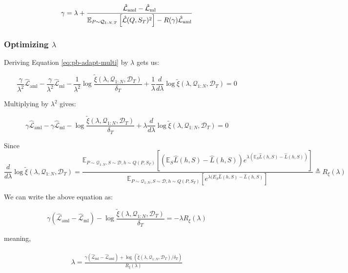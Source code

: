 \documentclass{article}
\theoremstyle{definition}
\newcommand{\Expect}[2]{\mathbb{E}_{#1}\left [#2 \right ]}
\begin{document}
\begin{align} \label{eq:meta-pb-gamma}
\begin{split}
\gamma = \lambda+\frac{\hat{\mathcal{L}}_{\mathrm{aml}}-\hat{\mathcal{L}}_{\mathrm{ml}}}{\Expect{P\sim \mathcal{Q}_{1:N,T}}{\hat{\mathcal{L}}(Q,S_T)^2}-R(\gamma)\hat{\mathcal{L}}_{\mathrm{aml}}}
\end{split}\hfill
\end{align}

\subsubsection{Optimizing $\lambda$}

Deriving Equation \ref{eq:pb-adapt-multi} by $\lambda$ gets us:

$$\frac{\gamma}{\lambda^2} \hat{\mathcal{L}}_{\mathrm{aml}}-\frac{\gamma}{\lambda^2}\hat{\mathcal{L}}_{\mathrm{ml}}-\frac{1}{\lambda^2}\log\frac{\tilde{\xi}(\lambda,\mathcal{Q}_{1:N},\mathcal{D}_T)}{\delta_T}+\frac{1}{\lambda}\frac{d}{d\lambda}\log\tilde{\xi}(\lambda,\mathcal{Q}_{1:N},\mathcal{D}_T)=0$$

Multiplying by $\lambda^2$ gives:

$$\gamma \hat{\mathcal{L}}_{\mathrm{aml}}-\gamma\hat{\mathcal{L}}_{\mathrm{ml}}-\log\frac{\tilde{\xi}(\lambda,\mathcal{Q}_{1:N},\mathcal{D}_T)}{\delta_T}+\lambda\frac{d}{d\lambda}\log\tilde{\xi}(\lambda,\mathcal{Q}_{1:N},\mathcal{D}_T)=0$$

Since 
$$\frac{d}{d\lambda}\log\tilde{\xi}(\lambda,\mathcal{Q}_{1:N},\mathcal{D}_T)=\frac{\Expect{P\sim \mathcal{Q}_{1:N},S\sim \mathcal{D},h\sim Q(P,S_T)}{(\mathbb{E}_S\hat{L}(h, S)-\hat{L}(h, S))e^{\lambda(\mathbb{E}_S\hat{L}(h, S)-\hat{L}(h, S))} }}{\Expect{P\sim \mathcal{Q}_{1:N},S\sim \mathcal{D},h\sim Q(P,S_T)}{e^{\lambda(E_S\hat{L}(h, S)-\hat{L}(h, S)} }}\triangleq R_\xi(\lambda)$$

We can write the above equation as:

$$\gamma(\hat{\mathcal{L}}_{\mathrm{aml}}-\hat{\mathcal{L}}_{\mathrm{ml}})-\log\frac{\tilde{\xi}(\lambda,\mathcal{Q}_{1:N},\mathcal{D}_T)}{\delta_T}=-\lambda R_\xi(\lambda)$$

meaning,

\begin{align} \label{eq:meta-pb-lambda}
\begin{split}
\lambda = \frac{\gamma(\hat{\mathcal{L}}_{\mathrm{ml}}-\hat{\mathcal{L}}_{\mathrm{aml}})+\log\left (\tilde{\xi}(\lambda,\mathcal{Q}_{1:N},\mathcal{D}_T)/\delta_T\right )}{R_\xi(\lambda)}
\end{split}
\end{align}
\end{document}
